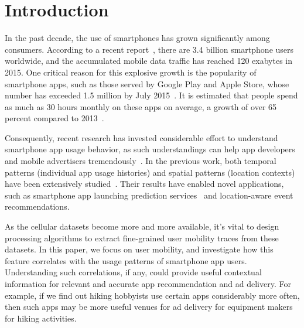 \section{Introduction}\label{intro}

In the past decade, the use of smartphones has grown significantly among consumers.
According to a recent report~\cite{Ericsson}, there are 3.4 billion smartphone users worldwide,
and the accumulated mobile data traffic has reached 120 exabytes in 2015.
One critical reason for this explosive growth is the popularity of smartphone apps,
such as those served by Google Play and Apple Store,
whose number has exceeded 1.5 million by July 2015~\cite{Statista}.
It is estimated that people spend as much as 30 hours monthly on these apps on average,
a growth of over 65 percent compared to 2013~\cite{Nielsen}.

Consequently, recent research has invested considerable effort to understand smartphone app usage behavior,
as such understandings can help app developers and mobile advertisers tremendously~\cite{xu2011identifying,yang2015characterizing}.
In the previous work, both temporal patterns (\eg individual app usage histories) and
spatial patterns (\eg location contexts) have been extensively studied~\cite{meng2014analyzing}.
Their results have enabled novel applications,
such as smartphone app launching prediction services~\cite{yan2012fast}
and location-aware event recommendations.

As the cellular datasets become more and more available, it’s vital to design processing algorithms to extract fine-grained user mobility traces from these datasets. In this paper, we focus on user mobility,
and investigate how this feature correlates with the usage patterns of smartphone app users.
Understanding such correlations, if any, could provide useful contextual information
for relevant and accurate app recommendation and ad delivery.
For example, if we find out hiking hobbyists use certain apps considerably more often,
then such apps may be more useful venues for ad delivery for equipment makers for hiking activities.

